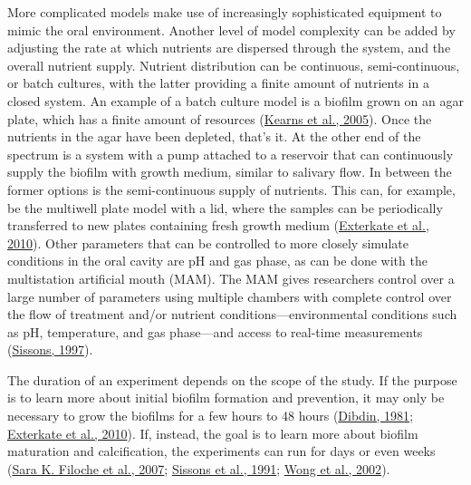\documentclass[
  letterpaper,
]{book}
\begin{document}
More complicated models make use of increasingly sophisticated equipment
to mimic the oral environment. Another level of model complexity can be
added by adjusting the rate at which nutrients are dispersed through the
system, and the overall nutrient supply. Nutrient distribution can be
continuous, semi-continuous, or batch cultures, with the latter
providing a finite amount of nutrients in a closed system. An example of
a batch culture model is a biofilm grown on an agar plate, which has a
finite amount of resources
(\protect\hyperlink{ref-kearnsMasterRegulator2005}{Kearns et al.,
2005}). Once the nutrients in the agar have been depleted, that's it. At
the other end of the spectrum is a system with a pump attached to a
reservoir that can continuously supply the biofilm with growth medium,
similar to salivary flow. In between the former options is the
semi-continuous supply of nutrients. This can, for example, be the
multiwell plate model with a lid, where the samples can be periodically
transferred to new plates containing fresh growth medium
(\protect\hyperlink{ref-extercateAAA2010}{Exterkate et al., 2010}).
Other parameters that can be controlled to more closely simulate
conditions in the oral cavity are pH and gas phase, as can be done with
the multistation artificial mouth (MAM). The MAM gives researchers
control over a large number of parameters using multiple chambers with
complete control over the flow of treatment and/or nutrient
conditions---environmental conditions such as pH, temperature, and gas
phase---and access to real-time measurements
(\protect\hyperlink{ref-sissonsArtificialPlaque1997}{Sissons, 1997}).

The duration of an experiment depends on the scope of the study. If the
purpose is to learn more about initial biofilm formation and prevention,
it may only be necessary to grow the biofilms for a few hours to 48
hours (\protect\hyperlink{ref-dibdinDiffusionSugars1981}{Dibdin, 1981};
\protect\hyperlink{ref-extercateAAA2010}{Exterkate et al., 2010}). If,
instead, the goal is to learn more about biofilm maturation and
calcification, the experiments can run for days or even weeks
(\protect\hyperlink{ref-filocheFluorescenceAssay2007}{Sara K. Filoche et
al., 2007};
\protect\hyperlink{ref-sissonsMultistationPlaque1991}{Sissons et al.,
1991}; \protect\hyperlink{ref-wongCalciumPhosphate2002}{Wong et al.,
2002}).
\end{document}
